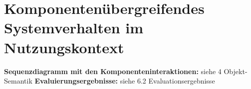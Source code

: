 \chapter{Komponentenübergreifendes Systemverhalten im Nutzungskontext}
\textbf{Sequenzdiagramm mit den Komponenteninteraktionen:} siehe 4 Objekt-Semantik
\textbf{Evaluierungsergebnisse:} siehe 6.2 Evaluationsergebnisse